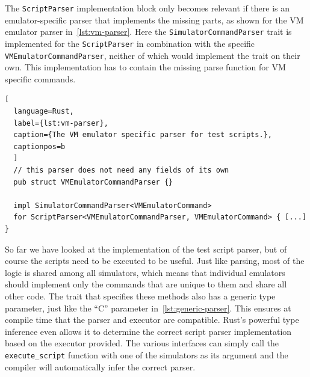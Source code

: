 The \verb+ScriptParser+ implementation block only becomes relevant if there is an emulator-specific parser that implements the missing parts, as shown for the VM emulator parser in~\cref{lst:vm-parser}.
Here the \verb+SimulatorCommandParser+ trait is implemented for the \verb+ScriptParser+ in combination with the specific \verb+VMEmulatorCommandParser+, neither of which would implement the trait on their own.
This implementation has to contain the missing parse function for VM specific commands.
\begin{lstlisting}[
  language=Rust,
  label={lst:vm-parser},
  caption={The VM emulator specific parser for test scripts.},
  captionpos=b
  ]
  // this parser does not need any fields of its own
  pub struct VMEmulatorCommandParser {}

  impl SimulatorCommandParser<VMEmulatorCommand>
  for ScriptParser<VMEmulatorCommandParser, VMEmulatorCommand> { [...] }
\end{lstlisting}

So far we have looked at the implementation of the test script parser, but of course the scripts need to be executed to be useful.
Just like parsing, most of the logic is shared among all simulators, which means that individual emulators should implement only the commands that are unique to them and share all other code.
The trait that specifies these methods also has a generic type parameter, just like the ``C'' parameter in~\cref{lst:generic-parser}.
This ensures at compile time that the parser and executor are compatible.
Rust's powerful type inference even allows it to determine the correct script parser implementation based on the executor provided.
The various interfaces can simply call the \verb+execute_script+ function with one of the simulators as its argument and the compiler will automatically infer the correct parser.


